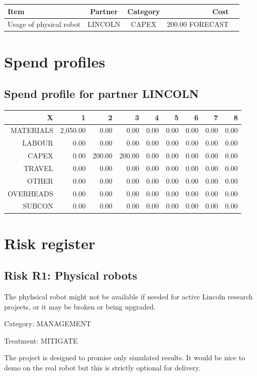 \documentclass[english]{article}
\begin{document}
\begin{tabular}{ | l | c | c | r | c | }
\hline
 Item & Partner & Category & Cost \\ 
 \hline
 Usage of physical robot & LINCOLN & CAPEX & 200.00 FORECAST\\ 
\hline
 \end{tabular}

\newpage\section{Spend profiles}

\subsection{Spend profile for partner LINCOLN}

\begin{tabular}{|r|r|r|r|r|r|r|r|r|}\hline
 X & 1 & 2 & 3 & 4 & 5 & 6 & 7 & 8  \tabularnewline
\hline
\hline
 MATERIALS & 2,050.00 & 0.00 & 0.00 & 0.00 & 0.00 & 0.00 & 0.00 & 0.00 \tabularnewline
\hline
 LABOUR & 0.00 & 0.00 & 0.00 & 0.00 & 0.00 & 0.00 & 0.00 & 0.00 \tabularnewline
\hline
 CAPEX & 0.00 & 200.00 & 200.00 & 0.00 & 0.00 & 0.00 & 0.00 & 0.00 \tabularnewline
\hline
 TRAVEL & 0.00 & 0.00 & 0.00 & 0.00 & 0.00 & 0.00 & 0.00 & 0.00 \tabularnewline
\hline
 OTHER & 0.00 & 0.00 & 0.00 & 0.00 & 0.00 & 0.00 & 0.00 & 0.00 \tabularnewline
\hline
 OVERHEADS & 0.00 & 0.00 & 0.00 & 0.00 & 0.00 & 0.00 & 0.00 & 0.00 \tabularnewline
\hline
 SUBCON & 0.00 & 0.00 & 0.00 & 0.00 & 0.00 & 0.00 & 0.00 & 0.00 \tabularnewline
\hline \end{tabular}\newpage

\section{Risk register}

\subsection*{Risk R1: Physical robots}

The phyhsical robot might not be available if needed for active Lincoln research projects, or it may be broken or being upgraded.

Category: MANAGEMENT

Treatment: MITIGATE

 The project is designed to promise only simulated results. It would be nice to demo on the real robot but this is strictly optional for delivery.
\end{document}
